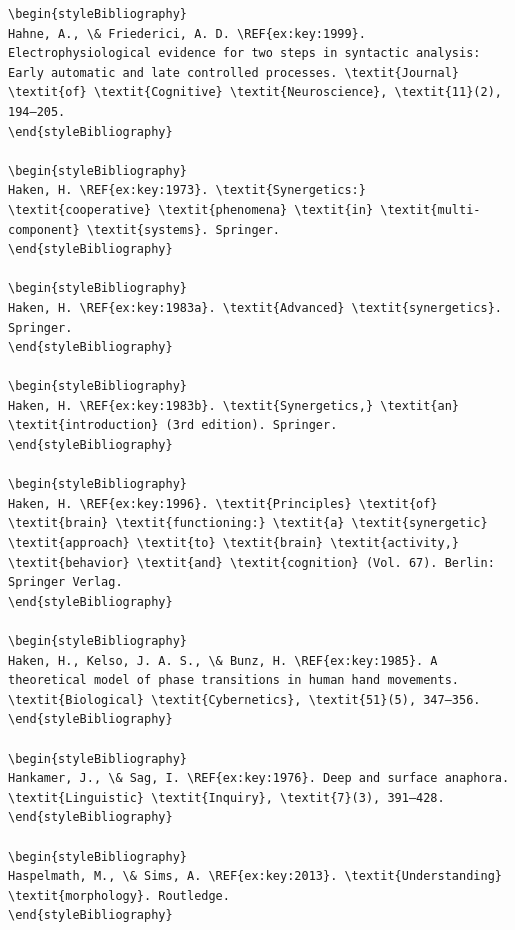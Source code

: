 \begin{verbatim}
\begin{styleBibliography}
Hahne, A., \& Friederici, A. D. \REF{ex:key:1999}. Electrophysiological evidence for two steps in syntactic analysis: Early automatic and late controlled processes. \textit{Journal} \textit{of} \textit{Cognitive} \textit{Neuroscience}, \textit{11}(2), 194–205.
\end{styleBibliography}

\begin{styleBibliography}
Haken, H. \REF{ex:key:1973}. \textit{Synergetics:} \textit{cooperative} \textit{phenomena} \textit{in} \textit{multi-component} \textit{systems}. Springer.
\end{styleBibliography}

\begin{styleBibliography}
Haken, H. \REF{ex:key:1983a}. \textit{Advanced} \textit{synergetics}. Springer.
\end{styleBibliography}

\begin{styleBibliography}
Haken, H. \REF{ex:key:1983b}. \textit{Synergetics,} \textit{an} \textit{introduction} (3rd edition). Springer.
\end{styleBibliography}

\begin{styleBibliography}
Haken, H. \REF{ex:key:1996}. \textit{Principles} \textit{of} \textit{brain} \textit{functioning:} \textit{a} \textit{synergetic} \textit{approach} \textit{to} \textit{brain} \textit{activity,} \textit{behavior} \textit{and} \textit{cognition} (Vol. 67). Berlin: Springer Verlag.
\end{styleBibliography}

\begin{styleBibliography}
Haken, H., Kelso, J. A. S., \& Bunz, H. \REF{ex:key:1985}. A theoretical model of phase transitions in human hand movements. \textit{Biological} \textit{Cybernetics}, \textit{51}(5), 347–356.
\end{styleBibliography}

\begin{styleBibliography}
Hankamer, J., \& Sag, I. \REF{ex:key:1976}. Deep and surface anaphora. \textit{Linguistic} \textit{Inquiry}, \textit{7}(3), 391–428.
\end{styleBibliography}

\begin{styleBibliography}
Haspelmath, M., \& Sims, A. \REF{ex:key:2013}. \textit{Understanding} \textit{morphology}. Routledge.
\end{styleBibliography}


\end{verbatim}
